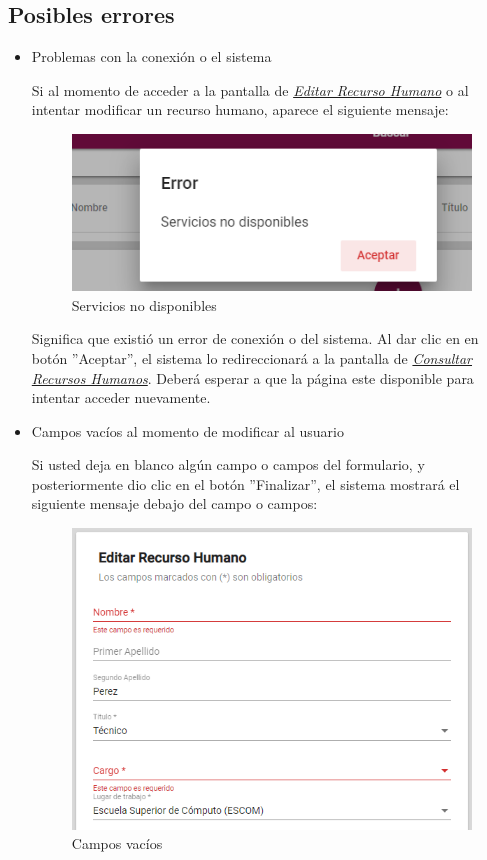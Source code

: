                 \subsection{Posibles errores}
                    \begin{itemize}
                        \item Problemas con la conexión o el sistema
                    
                            Si al momento de acceder a la pantalla de \hyperlink{editarRH}{\textit{Editar Recurso Humano}} o al intentar modificar un recurso humano, aparece el siguiente mensaje:
                            \clearpage
                            \begin{figure}[!hbtp]
                                \centering
                                \includegraphics[width=0.4\linewidth]{images/SP1/MSGSN}
                                \caption{Servicios no disponibles}
                                
                            \end{figure}
                           
                        
                            Significa que existió un error de conexión o del sistema. Al dar clic en en botón ''Aceptar'', el sistema lo redireccionará  a la pantalla de \hyperlink{consultarRH}{\textit{Consultar Recursos Humanos}}. Deberá esperar a que la página este disponible para intentar acceder nuevamente.
                    
                        \item Campos vacíos al momento de modificar al usuario
                    
                            Si usted deja en blanco algún campo o campos del formulario, y posteriormente dio clic en el botón ''Finalizar'', el sistema mostrará el siguiente mensaje debajo del campo o campos:
                           
                          \begin{figure}[!hbtp]
                            \centering
                            \includegraphics[width=0.4\linewidth]{images/SP1/MSG44-1}
                            \caption{Campos vacíos}
                            \label{mensaje44}
                         

\end{figure}
\end{itemize}
